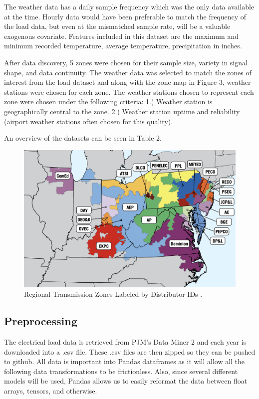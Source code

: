 \documentclass[sigconf]{acmart}
\begin{document}
  The weather data has a daily sample frequency which was the only data available at the time. Hourly data would have been preferable to match the frequency of the load data, but even at the mismatched sample rate, will be a valuable exogenous covariate. Features included in this dataset are the maximum and minimum recorded temperature, average temperature, precipitation in inches. 
  
  After data discovery, 5 zones were chosen for their sample size, variety in signal shape, and data continuity. The weather data was selected to match the zones of interest from the load dataset and along with the zone map in Figure 3, weather stations were chosen for each zone. The weather stations chosen to represent each zone were chosen under the following criteria: 1.) Weather station is geographically central to the zone. 2.) Weather station uptime and reliability (airport weather stations often chosen for this quality).
  
  An overview of the datasets can be seen in Table 2.
  
  \begin{figure}
    \includegraphics[width=\columnwidth]{Images/Zones.png}
    \caption{Regional Transmission Zones Labeled by Distributor IDs \protect \cite{PJM24}.}
    \Description{}
    \label{fig:zone}
  \end{figure}

  \subsection{Preprocessing}
  The electrical load data is retrieved from PJM's Data Miner 2 and each year is downloaded into a .csv file. These .csv files are then zipped so they can be pushed to github. All data is important into Pandas dataframes as it will allow all the following data transformations to be frictionless. Also, since several different models will be used, Pandas allows us to easily reformat the data between float arrays, tensors, and otherwise.
  
\end{document}

